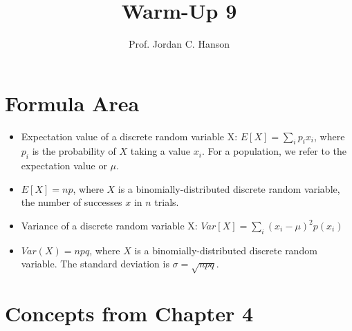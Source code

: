 \documentclass{article}
\begin{document}
\title{Warm-Up 9}
\author{Prof. Jordan C. Hanson}

\maketitle

\section{Formula Area}

\begin{itemize}
\item Expectation value of a discrete random variable X: $E[X] = \sum_i p_i x_i$, where $p_i$ is the probability of $X$ taking a value $x_i$.  For a population, we refer to the expectation value or $\mu$.
\item $E[X] = n p$, where $X$ is a binomially-distributed discrete random variable, the number of successes $x$ in $n$ trials.
\item Variance of a discrete random variable X: $Var[X] = \sum_i (x_i - \mu)^2 p(x_i)$
\item $Var(X) = n p q$, where $X$ is a binomially-distributed discrete random variable.  The standard deviation is $\sigma = \sqrt{npq}$.
\end{itemize}

\section{Concepts from Chapter 4}
\end{document}
